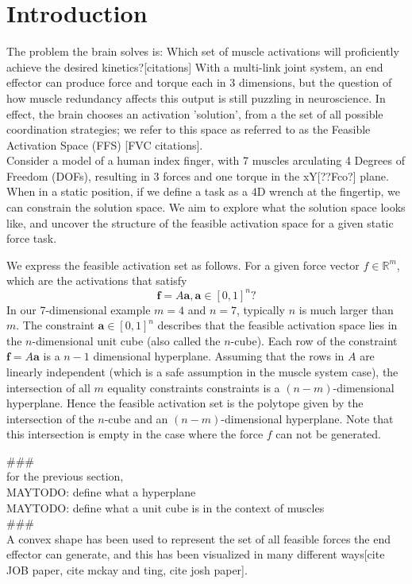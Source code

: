 \section{Introduction}

The problem the brain solves is: Which set of muscle activations will proficiently achieve the desired kinetics?[citations]
With a multi-link joint system, an end effector can produce force and torque each in 3 dimensions, but the question of how muscle redundancy affects this output is still puzzling in neuroscience.
In effect, the brain chooses an activation 'solution', from a the set of all possible coordination strategies; we refer to this space as referred to as the Feasible Activation Space (FFS) [FVC citations].
\\

Consider a model of a human index finger, with 7 muscles arculating 4 Degrees of Freedom (DOFs), resulting in 3 forces and one torque in the xY[??Fco?] plane. When in a static position, if we define a task as a 4D wrench at the fingertip, we can constrain the solution space.
We aim to explore what the solution space looks like, and uncover the structure of the feasible activation space for a given static force task.


We express the feasible activation set as follows. 
For a given force vector $f \in \mathbb{R}^m$, which are the activations that satisfy
\[\textbf{f} = A\textbf{a}, \textbf{a} \in [0,1]^n?\]
In our 7-dimensional example $m =4$ and $n =7$, typically $n$ is much larger than $m$.
The constraint $\textbf{a} \in [0,1]^n$ describes that the feasible activation space lies in the $n$-dimensional unit cube (also called the $n$-cube).
Each row of the constraint $\textbf{f} = A\textbf{a}$ is a $n-1$ dimensional hyperplane.
Assuming that the rows in $A$ are linearly independent (which is a safe assumption in the muscle system case), the intersection of all $m$ equality constraints constraints is a $(n-m)$-dimensional hyperplane.
Hence the feasible activation set is the polytope given by the intersection of the $n$-cube and an $(n-m)$-dimensional hyperplane.
Note that this intersection is empty in the case where the force $f$ can not be generated.


###\\
for the previous section,\\
MAYTODO: define what a hyperplane \\
MAYTODO: define what a unit cube is in the context of muscles \\
###\\
A convex shape has been used to represent the set of all feasible forces the end effector can generate, and this has been visualized in many different ways[cite JOB paper, cite mckay and ting, cite josh paper].


